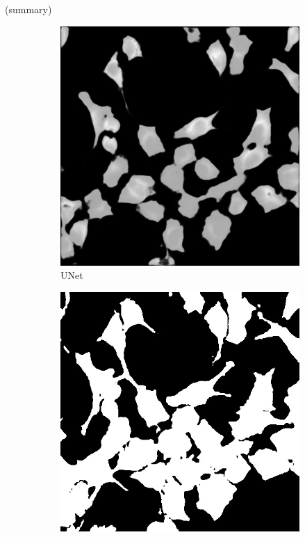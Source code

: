 \documentclass[10pt, journal, compsoc]{IEEEtran}
\begin{document}
(summary)
\begin{figure}
\centering
\begin{subfigure}[b]{0.45\linewidth}
\includegraphics[width=\linewidth]{weighted/110115-unet.jpg}
\caption{UNet}
\end{subfigure}
\begin{subfigure}[b]{0.45\linewidth}
\includegraphics[width=\linewidth]{weighted/110115-deeplab.jpg}

\end{subfigure}
\end{figure}
\end{document}
